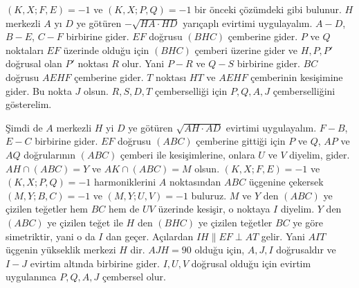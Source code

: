 \documentclass[12pt]{scrartcl}
\begin{document}
\begin{answer*}[Evirtim]
    $(K,X;F,E)=-1$ ve $(K,X;P,Q)=-1$ bir önceki çözümdeki gibi bulunur. $H$ merkezli $A$ yı $D$ ye götüren $-\sqrt{HA\cdot HD}$ yarıçaplı evirtimi uygulayalım. $A-D$, $B-E$, $C-F$ birbirine gider. $EF$ doğrusu $(BHC)$ çemberine gider. $P$ ve $Q$ noktaları $EF$ üzerinde olduğu için $(BHC)$ çemberi üzerine gider ve $H,P,P'$ doğrusal olan $P'$ noktası $R$ olur. Yani $P-R$ ve $Q-S$ birbirine gider. $BC$ doğrusu $AEHF$ çemberine gider. $T$ noktası $HT$ ve $AEHF$ çemberinin kesişimine gider. Bu nokta $J$ olsun. $R,S,D,T$ çemberselliği için $P,Q,A,J$ çemberselliğini gösterelim. 

    Şimdi de $A$ merkezli $H$ yi $D$ ye götüren $\sqrt{AH\cdot AD}$ evirtimi uygulayalım. $F-B$, $E-C$ birbirine gider. $EF$ doğrusu $(ABC)$ çemberine gittiği için $P$ ve $Q$, $AP$ ve $AQ$ doğrularının $(ABC)$ çemberi ile kesişimlerine, onlara $U$ ve $V$ diyelim, gider. $AH\cap (ABC)=Y$ ve $AK\cap (ABC)=M$ olsun. $(K,X;F,E)=-1$ ve $(K,X;P,Q)=-1$ harmoniklerini $A$ noktasından $ABC$ üçgenine çekersek $(M,Y;B,C)=-1$ ve $(M,Y;U,V)=-1$ buluruz. $M$ ve $Y$ den $(ABC)$ ye çizilen teğetler hem $BC$ hem de $UV$ üzerinde kesişir, o noktaya $I$ diyelim. $Y$ den $(ABC)$ ye çizilen teğet ile $H$ den $(BHC)$ ye çizilen teğetler $BC$ ye göre simetriktir, yani o da $I$ dan geçer. Açılardan $IH\parallel EF\perp AT$ gelir. Yani $AIT$ üçgenin yükseklik merkezi $H$ dir. $AJH=90$ olduğu için, $A,J,I$ doğrusaldır ve $I-J$ evirtim altında birbirine gider. $I,U,V$ doğrusal olduğu için evirtim uygulanınca $P,Q,A,J$ çembersel olur. 
\end{answer*}
\end{document}
